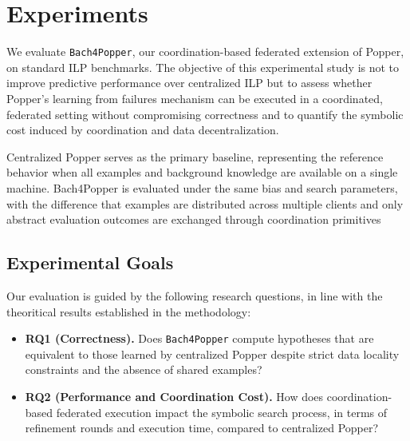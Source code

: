\section{Experiments}
\label{sect-experiments}
We evaluate \texttt{Bach4Popper}, our coordination-based federated extension of Popper, on standard ILP benchmarks.
The objective of this experimental study is not to improve predictive performance over centralized ILP but to assess whether Popper's learning from failures mechanism can be executed in a coordinated, federated setting without compromising correctness and to quantify the symbolic cost induced by coordination and data decentralization. 

Centralized Popper serves as the primary baseline, representing the reference behavior when all examples and background knowledge are available on a single machine. Bach4Popper is evaluated under the same bias and search parameters, with the difference that examples are distributed across multiple clients and only abstract evaluation outcomes are exchanged through coordination primitives
\subsection{Experimental Goals}
Our evaluation is guided by the following research questions, in line with the theoritical results established in the methodology:
\begin{itemize}
    \item  \textbf{RQ1 (Correctness).}  Does \texttt{Bach4Popper} compute hypotheses that are equivalent to those learned by centralized Popper despite strict data locality constraints and the absence of shared examples?
    \item  \textbf{RQ2 (Performance and Coordination Cost).}  How does coordination-based federated execution impact the symbolic search process, in terms of refinement rounds and execution time, compared to centralized Popper?
\end{itemize}




